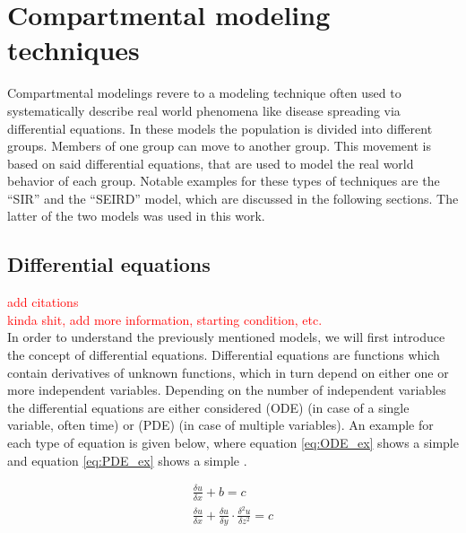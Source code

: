 \section{Compartmental modeling techniques}
Compartmental modelings revere to a modeling technique often used to systematically describe real world phenomena
like disease spreading via differential equations\cite{compartementMod}. In these models the population is divided into different groups. 
Members of one group can move to another group. This movement is based on said differential equations, that are used to model the real
world behavior of each group. Notable examples for these types of techniques are the ``SIR'' and the ``SEIRD'' model, which are discussed in
the following sections. The latter of the two models was used in this work.


\subsection{Differential equations}
\textcolor{red}{add citations}\\ %
\textcolor{red}{kinda shit, add more information, starting condition, etc.}\\ %
In order to understand the previously mentioned models, we will first introduce the concept of differential equations.
Differential equations are functions which contain derivatives of unknown functions, which in turn depend
on either one or more independent variables. Depending on the number of independent variables the differential
equations are either considered  (ODE) (in case of a single variable, often time) or
 (PDE) (in case of multiple variables). An example for each type of equation
is given below, where equation \ref*{eq:ODE_ex} shows a simple  and equation \ref*{eq:PDE_ex} shows a
simple .\newline

\begin{align}
	\frac{\delta u}{\delta x} + b = c \label{eq:ODE_ex}\\
	\frac{\delta u}{\delta x} + \frac{\delta u}{\delta y} \cdot \frac{\delta^2 u}{\delta z^2} = c \label{eq:PDE_ex}
\end{align}

